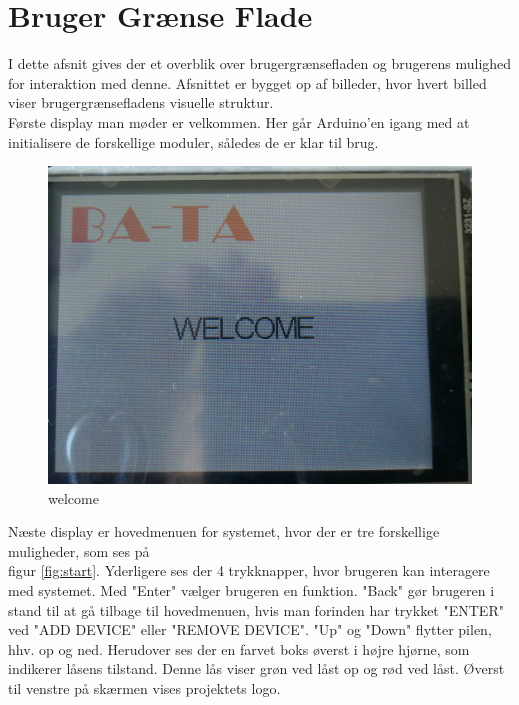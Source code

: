 \graphicspath{{Chapters/Userinterface/}}


\section{Bruger Grænse Flade}
I dette afsnit gives der et overblik over brugergrænsefladen og brugerens mulighed for interaktion med denne. Afsnittet er bygget op af billeder, hvor hvert billed viser brugergrænsefladens visuelle struktur. \\

Første display man møder er velkommen. Her går Arduino'en igang med at initialisere de forskellige moduler, således de er klar til brug.
\begin{figure}[H]
	\centering
	\includegraphics[width = 300 pt]{Img/welcome.jpg}
	\caption{welcome}
	\label{fig:welcome}
\end{figure}
Næste display er hovedmenuen for systemet, hvor der er tre forskellige muligheder, som ses på \\figur     \ref{fig:start}. Yderligere ses der 4 trykknapper, hvor brugeren kan interagere med systemet. Med "Enter" vælger brugeren en funktion. "Back" gør brugeren i stand til at gå tilbage til hovedmenuen, hvis man forinden har trykket "ENTER" ved "ADD DEVICE" eller "REMOVE DEVICE". "Up" og "Down" flytter pilen, hhv. op og ned. Herudover ses der en farvet boks øverst i højre hjørne, som indikerer låsens tilstand. Denne lås viser grøn ved låst op og rød ved låst. Øverst til venstre på skærmen vises projektets logo.    
